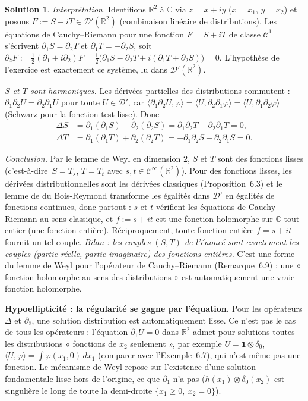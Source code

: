 \documentclass[11pt,a4paper]{article}
\newcommand{\R}{\mathbb{R}}
\newcommand{\C}{\mathbb{C}}
\newcommand{\Cinf}{\mathcal{C}^\infty}
\newcommand{\ie}{c'est-à-dire}
\newcommand{\D}{\mathcal{D}}
\theoremstyle{definition}
\newtheorem*{solution}{Solution}
\begin{document}
\begin{solution}
\emph{Interprétation.} Identifions $\R^2$ à $\C$ via $z=x+iy$ ($x=x_1$, $y=x_2$) et posons $F:=S+iT\in\D'(\R^2)$ (combinaison linéaire de distributions). Les équations de Cauchy--Riemann pour une fonction $F=S+iT$ de classe $\mathcal C^1$ s'écrivent $\partial_1S=\partial_2T$ et $\partial_1T=-\partial_2S$, soit $\partial_{\bar z}F:=\frac12(\partial_1+i\partial_2)F=\frac12\big(\partial_1S-\partial_2T+i(\partial_1T+\partial_2S)\big)=0$. L'hypothèse de l'exercice est exactement ce système, lu dans $\D'(\R^2)$.

\emph{$S$ et $T$ sont harmoniques.} Les dérivées partielles des distributions commutent : $\partial_1\partial_2U=\partial_2\partial_1U$ pour toute $U\in\D'$, car $\langle\partial_1\partial_2U,\varphi\rangle=\langle U,\partial_2\partial_1\varphi\rangle=\langle U,\partial_1\partial_2\varphi\rangle$ (Schwarz pour la fonction test lisse). Donc
\[
\begin{aligned}
\Delta S&=\partial_1(\partial_1S)+\partial_2(\partial_2S)=\partial_1\partial_2T-\partial_2\partial_1T=0,\\
\Delta T&=\partial_1(\partial_1T)+\partial_2(\partial_2T)=-\partial_1\partial_2S+\partial_2\partial_1S=0 .
\end{aligned}
\]

\emph{Conclusion.} Par le lemme de Weyl en dimension $2$, $S$ et $T$ sont des fonctions lisses (\ie\ $S=T_s$, $T=T_t$ avec $s,t\in\Cinf(\R^2)$). Pour des fonctions lisses, les dérivées distributionnelles sont les dérivées classiques (Proposition~6.3) et le lemme de du Bois-Reymond transforme les égalités dans $\D'$ en égalités de fonctions continues, donc partout : $s$ et $t$ vérifient les équations de Cauchy--Riemann au sens classique, et $f:=s+it$ est une fonction holomorphe sur $\C$ tout entier (une fonction entière). Réciproquement, toute fonction entière $f=s+it$ fournit un tel couple. \emph{Bilan : les couples $(S,T)$ de l'énoncé sont exactement les couples (partie réelle, partie imaginaire) des fonctions entières.} C'est une forme du lemme de Weyl pour l'opérateur de Cauchy--Riemann (Remarque~6.9) : une « fonction holomorphe au sens des distributions » est automatiquement une vraie fonction holomorphe.
\end{solution}

\begin{pointcle}
\textbf{Hypoellipticité : la régularité se gagne par l'équation.} Pour les opérateurs $\Delta$ et $\partial_{\bar z}$, une solution distribution est automatiquement lisse. Ce n'est pas le cas de tous les opérateurs : l'équation $\partial_1U=0$ dans $\R^2$ admet pour solutions toutes les distributions « fonctions de $x_2$ seulement », par exemple $U=\mathbf 1\otimes\delta_0$, $\langle U,\varphi\rangle=\int\varphi(x_1,0)\,dx_1$ (comparer avec l'Exemple~6.7), qui n'est même pas une fonction. Le mécanisme de Weyl repose sur l'existence d'une solution fondamentale lisse hors de l'origine, ce que $\partial_1$ n'a pas ($h(x_1)\otimes\delta_0(x_2)$ est singulière le long de toute la demi-droite $\{x_1\ge0,\ x_2=0\}$).
\end{pointcle}
\end{document}
